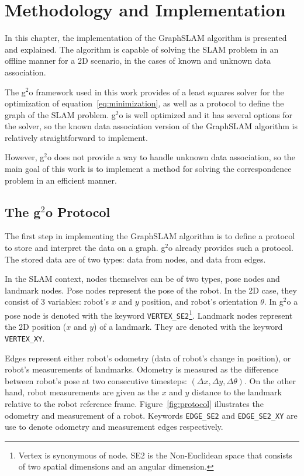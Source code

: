 \chapter{Methodology and Implementation}
\label{chap:implementation}
 
In this chapter, the implementation of the GraphSLAM algorithm is presented and explained. The algorithm is capable of solving the SLAM problem in an offline manner for a 2D scenario, in the cases of known and unknown data association.

The g$^2$o framework used in this work provides of a least squares solver for the optimization of equation~\eqref{eq:minimization}, as well as a protocol to define the graph of the SLAM problem. g$^2$o is well optimized and it has several options for the solver, so the known data association version of the GraphSLAM algorithm is relatively straightforward to implement.

However, g$^2$o does not provide a way to handle unknown data association, so the main goal of this work is to implement a method for solving the correspondence problem in an efficient manner.

\section{The g$^2$o Protocol}

The first step in implementing the GraphSLAM algorithm is to define a protocol to store and interpret the data on a graph. g$^2$o already provides such a protocol. The stored data are of two types: data from nodes, and data from edges. 

In the SLAM context, nodes themselves can be of two types, pose nodes and landmark nodes. Pose nodes represent the pose of the robot. In the 2D case, they consist of 3 variables: robot's $x$ and $y$ position, and robot's orientation $\theta$. In g$^2$o a pose node is denoted with the keyword \texttt{VERTEX\_SE2}\footnote{Vertex is synonymous of node. SE2 is the Non-Euclidean space that consists of two spatial dimensions and an angular dimension.}. Landmark nodes represent the 2D position ($x$ and $y$) of a landmark. They are denoted with the keyword \texttt{VERTEX\_XY}.

Edges represent either robot's odometry (data of robot's change in position), or robot's measurements of landmarks. Odometry is measured as the difference between robot's pose at two consecutive timesteps: $(\Delta x, \Delta y, \Delta \theta)$. On the other hand, robot measurements are given as the $x$ and $y$ distance to the landmark relative to the robot reference frame. Figure~\ref{fig:protocol} illustrates the odometry and measurement of a robot. Keywords \texttt{EDGE\_SE2} and \texttt{EDGE\_SE2\_XY} are use to denote odometry and measurement edges respectively.

